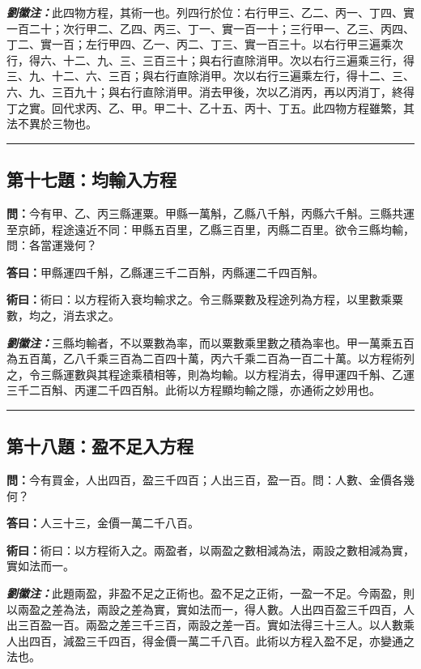 \documentclass[11pt,a4paper]{article}
\newcommand{\wen}[1]{\textbf{\color{problemcolor}問：}#1\par}
\newcommand{\da}[1]{\textbf{答曰：}#1\par}
\newcommand{\shu}[1]{\textbf{術曰：}#1\par}
\newcommand{\liuhui}[1]{{\color{commentarycolor}\textit{\textbf{劉徽注：}}#1\par}}
\begin{document}
\liuhui{此四物方程，其術一也。列四行於位：右行甲三、乙二、丙一、丁四、實一百二十；次行甲二、乙四、丙三、丁一、實一百一十；三行甲一、乙三、丙四、丁二、實一百；左行甲四、乙一、丙二、丁三、實一百三十。以右行甲三遍乘次行，得六、十二、九、三、三百三十；與右行直除消甲。次以右行三遍乘三行，得三、九、十二、六、三百；與右行直除消甲。次以右行三遍乘左行，得十二、三、六、九、三百九十；與右行直除消甲。消去甲後，次以乙消丙，再以丙消丁，終得丁之實。回代求丙、乙、甲。甲二十、乙十五、丙十、丁五。此四物方程雖繁，其法不異於三物也。}

\bigskip
\hrule
\bigskip

\subsection{第十七題：均輸入方程}

\wen{今有甲、乙、丙三縣運粟。甲縣一萬斛，乙縣八千斛，丙縣六千斛。三縣共運至京師，程途遠近不同：甲縣五百里，乙縣三百里，丙縣二百里。欲令三縣均輸，問：各當運幾何？}

\da{甲縣運四千斛，乙縣運三千二百斛，丙縣運二千四百斛。}

\shu{術曰：以方程術入衰均輸求之。令三縣粟數及程途列為方程，以里數乘粟數，均之，消去求之。}

\liuhui{三縣均輸者，不以粟數為率，而以粟數乘里數之積為率也。甲一萬乘五百為五百萬，乙八千乘三百為二百四十萬，丙六千乘二百為一百二十萬。以方程術列之，令三縣運數與其程途乘積相等，則為均輸。以方程消去，得甲運四千斛、乙運三千二百斛、丙運二千四百斛。此術以方程顯均輸之隱，亦通術之妙用也。}

\bigskip
\hrule
\bigskip

\subsection{第十八題：盈不足入方程}

\wen{今有買金，人出四百，盈三千四百；人出三百，盈一百。問：人數、金價各幾何？}

\da{人三十三，金價一萬二千八百。}

\shu{術曰：以方程術入之。兩盈者，以兩盈之數相減為法，兩設之數相減為實，實如法而一。}

\liuhui{此題兩盈，非盈不足之正術也。盈不足之正術，一盈一不足。今兩盈，則以兩盈之差為法，兩設之差為實，實如法而一，得人數。人出四百盈三千四百，人出三百盈一百。兩盈之差三千三百，兩設之差一百。實如法得三十三人。以人數乘人出四百，減盈三千四百，得金價一萬二千八百。此術以方程入盈不足，亦變通之法也。}
\end{document}
